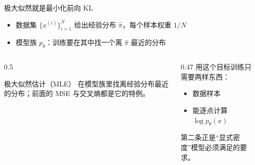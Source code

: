 \documentclass[aspectratio=169,10pt,UTF8,fontset=none]{ctexbeamer}
\begin{document}
\begin{frame}{极大似然就是最小化前向 KL}
  \begin{itemize}
    \item 数据集 $\{x^{(i)}\}_{i=1}^N$ 给出经验分布 $\hat\pi$，每个样本权重 $1/N$
    \item 模型族 $p_\theta$：训练要在其中找一个离 $\hat\pi$ 最近的分布
  \end{itemize}
  \begin{keystep}
  \end{keystep}
  \begin{columns}[T]
    \begin{column}{0.5\textwidth}
      \begin{concept}{极大似然估计（MLE）}
        在模型族里找离经验分布最近的分布；前面的 MSE 与交叉熵都是它的特例。
      \end{concept}
    \end{column}
    \begin{column}{0.47\textwidth}
      \small
      用这个目标训练只需要两样东西：
      \begin{itemize}
        \item 数据样本
        \item 能逐点计算 $\log p_\theta(x)$
      \end{itemize}
      第二条正是“显式密度”模型必须满足的要求。
    \end{column}
  \end{columns}
\end{frame}
\end{document}
